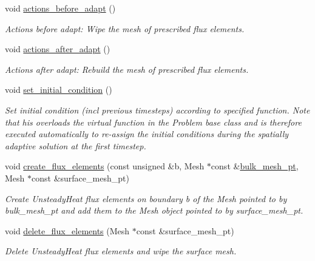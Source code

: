 \begin{DoxyCompactItemize}
void \hyperlink{classRefineableUnsteadyHeatProblem_a4419fcea0ccbf0509f1d5dd37d8301de}{actions\+\_\+before\+\_\+adapt} ()
\begin{DoxyCompactList}\small\item\em Actions before adapt\+: Wipe the mesh of prescribed flux elements. \end{DoxyCompactList}\item 
void \hyperlink{classRefineableUnsteadyHeatProblem_a1f8a9e91269440c799a2075f989d62b1}{actions\+\_\+after\+\_\+adapt} ()
\begin{DoxyCompactList}\small\item\em Actions after adapt\+: Rebuild the mesh of prescribed flux elements. \end{DoxyCompactList}\item 
void \hyperlink{classRefineableUnsteadyHeatProblem_a30e2e1d62b059982f7014b74f4fe2be9}{set\+\_\+initial\+\_\+condition} ()
\begin{DoxyCompactList}\small\item\em Set initial condition (incl previous timesteps) according to specified function. Note that his overloads the virtual function in the Problem base class and is therefore executed automatically to re-\/assign the initial conditions during the spatially adaptive solution at the first timestep. \end{DoxyCompactList}\item 
void \hyperlink{classRefineableUnsteadyHeatProblem_a65601ec64c73ac578b43f4af04c46569}{create\+\_\+flux\+\_\+elements} (const unsigned \&b, Mesh $\ast$const \&\hyperlink{classRefineableUnsteadyHeatProblem_a4d8eec1505a3c53960a3182ec462b4e7}{bulk\+\_\+mesh\+\_\+pt}, Mesh $\ast$const \&surface\+\_\+mesh\+\_\+pt)
\begin{DoxyCompactList}\small\item\em Create Unsteady\+Heat flux elements on boundary b of the Mesh pointed to by bulk\+\_\+mesh\+\_\+pt and add them to the Mesh object pointed to by surface\+\_\+mesh\+\_\+pt. \end{DoxyCompactList}\item 
void \hyperlink{classRefineableUnsteadyHeatProblem_ad2e53af5c385e44e33e400b430b610e8}{delete\+\_\+flux\+\_\+elements} (Mesh $\ast$const \&surface\+\_\+mesh\+\_\+pt)
\begin{DoxyCompactList}\small\item\em Delete Unsteady\+Heat flux elements and wipe the surface mesh. \end{DoxyCompactList}\item 

\end{DoxyCompactItemize}
